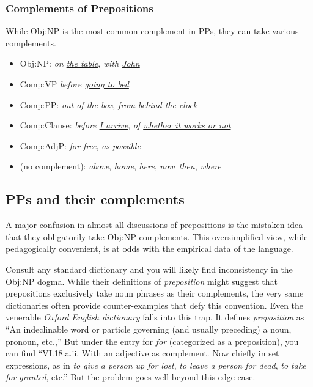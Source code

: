 \subsubsection*{Complements of Prepositions}\label{sec:PP-complementation}

While Obj:NP is the most common complement in PPs, they can take various complements.

\begin{itemize}
    \item Obj:NP: \textit{on \uline{the table}}, \textit{with \uline{John}}
    \item Comp:VP \textit{before \uline{going to bed}}
    \item Comp:PP: \textit{out \uline{of the box}}, \textit{from \uline{behind the clock}}
    \item Comp:Clause: \textit{before \uline{I arrive}}, \textit{of \uline{whether it works or not}}
    \item Comp:AdjP: \textit{for \uline{free}}, \textit{as \uline{possible}}
    \item (no complement): \textit{above}, \textit{home}, \textit{here}, \textit{now}\, \textit{then}, \textit{where}
\end{itemize}

\subsection{PPs and their complements}

A major confusion in almost all discussions of prepositions is the mistaken idea that they obligatorily take Obj:NP complements. This oversimplified view, while pedagogically convenient, is at odds with the empirical data of the language.

Consult any standard dictionary and you will likely find inconsistency in the Obj:NP dogma. While their definitions of \textit{preposition} might suggest that prepositions exclusively take noun phrases as their complements, the very same dictionaries often provide counter-examples that defy this convention. Even the venerable \textit{Oxford English dictionary} falls into this trap. It defines \textit{preposition} as ``An indeclinable word or particle governing (and usually preceding) a noun, pronoun, etc.,'' But under the entry for \textit{for} (categorized as a preposition), you can find ``VI.18.a.ii. With an adjective as complement. Now chiefly in set expressions, as in \textit{to give a person up for lost}, \textit{to leave a person for dead}, \textit{to take for granted}, etc.'' But the problem goes well beyond this edge case.

